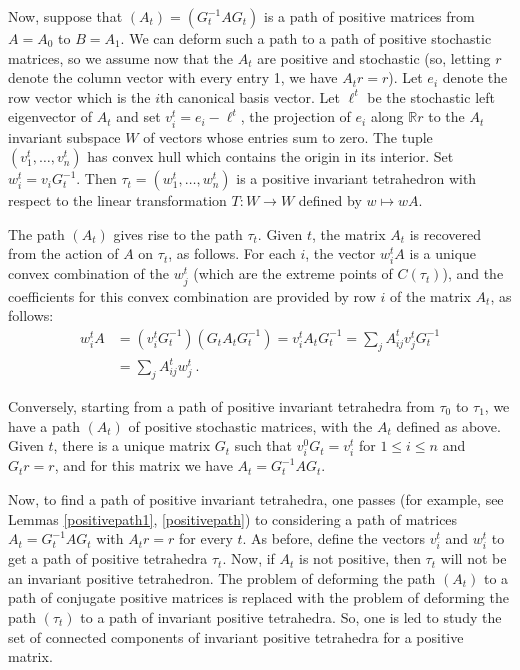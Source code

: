 \documentclass{amsart}
\theoremstyle{definition}
\theoremstyle{remark}
\numberwithin{equation}{section}
\begin{document}
{{Now, suppose that $(A_t)=(G_t^{-1}AG_t)$ is a path of positive 
matrices from $A=A_0$ to $B=A_1$. We can deform such a path 
to a path of positive stochastic matrices, so we assume now 
that the $A_t$ are positive and stochastic (so, letting $r$ 
denote 
the column vector with every entry 1, we have $A_tr=r$).  
Let $e_i$ denote the row vector which is the $i$th canonical 
basis vector. Let $\ell^t$ be the stochastic left eigenvector 
of $A_t$ and set $v_i^t= e_i-\ell^t$, the projection 
of $e_i$ along $\mathbb Rr$ to the $A_t$ invariant subspace 
$W$ of vectors whose entries sum to zero. The tuple 
$(v_1^t, \dots ,v_n^t)$ has convex hull which contains the origin 
in its interior. Set $w_i^t=v_iG_t^{-1}$. 
Then $\tau_t = (w_1^t, \dots ,w_n^t)$ is a positive invariant 
tetrahedron with respect to the linear transformation 
$T:W\to W$ defined by $w\mapsto wA$. 

The path $(A_t)$ gives rise to the path $\tau_t$. 
Given $t$, the matrix $A_t$ is recovered from the action of $A$ on 
$\tau_t$, as follows. For each $i$, the vector 
$w_i^tA$ is a unique convex combination of the
$w_j^t$ (which are the extreme points of 
$C(\tau_t)$), and the coefficients for this convex combination are 
provided by row $i$ of the matrix $A_t$, as follows:  
\begin{align*} 
 w_i^tA & = (v_i^tG_t^{-1})(G_tA_tG_t^{-1}) 
 = v_i^tA_tG_t^{-1} 
= \sum_jA_{ij}^tv_j^tG_t^{-1} \\ 
& = \sum_jA_{ij}^tw_j^t\ . 
\end{align*} 

Conversely, starting from  a path of positive invariant 
tetrahedra from $\tau_0$ to $\tau_1$, we have 
a path $(A_t)$ of positive stochastic matrices, 
with the $A_t$ defined as above. 
Given $t$, there is a unique matrix $G_t$ such that 
$v_i^0G_t = v_i^t$ for $1\leq i \leq n$ and $G_tr=r$, 
and for this matrix we have $A_t=G_t^{-1} AG_t$. 

Now, to find  a path of positive invariant tetrahedra, 
one passes (for example, see Lemmas 
\ref{positivepath1}, 
\ref{positivepath}) to considering a path of matrices 
$A_t=G_t^{-1}AG_t$ with $A_tr=r$ for every $t$. 
As before, define the vectors $v_i^t$ and 
$w_i^t$ to get a path of positive 
tetrahedra $\tau_t$. Now, if $A_t$ is not 
positive, then  $\tau_t$ 
will  not be an invariant positive tetrahedron. The 
problem of deforming the path $(A_t)$ to a 
path of conjugate positive matrices is replaced  
with the problem of deforming the path $(\tau_t) $ 
to a path of invariant positive tetrahedra. So, one 
is led to study the set of connected components of 
invariant positive tetrahedra for a positive matrix. 

}}
\end{document}
